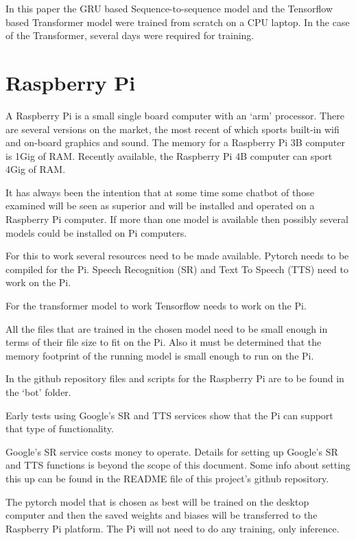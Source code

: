 In this paper the GRU based Sequence-to-sequence model and the Tensorflow based Transformer model were trained from scratch on a CPU laptop. In the case of the Transformer, several days were required for training.

\section{Raspberry Pi}

A Raspberry Pi is a small single board computer with an `arm' processor. There are 
several versions on the market, the most recent of which sports built-in wifi and
on-board graphics and sound. The memory for a Raspberry Pi 3B computer is 1Gig of RAM. Recently
available, the Raspberry Pi 4B computer can sport 4Gig of RAM.

It has always been the intention that at some time some chatbot of
those examined will be seen as superior and will be installed and
operated on a Raspberry Pi computer. If more than one model is available
then possibly several models could be installed on Pi computers.

For this to work several resources need to be made available. Pytorch
needs to be compiled for the Pi. Speech Recognition (\ac{SR}) and Text
To Speech (TTS) need to work on the Pi.

For the transformer model to work Tensorflow needs to work on the Pi.

All the files that are trained in the chosen model need to be small
enough in terms of their file size to fit on the Pi. Also it must
be determined that the memory footprint of the running model is small
enough to run on the Pi.

In the github repository files and scripts for the Raspberry Pi are
to be found in the \textquoteleft bot\textquoteright{} folder.

Early tests using Google\textquoteright s SR and TTS services show
that the Pi can support that type of functionality. 

Google's SR service costs money to operate. Details
for setting up Google's SR and TTS functions is beyond
the scope of this document. Some info about setting this up can be
found in the README file of this project\textquoteright s github
repository.

The pytorch model that is chosen as best will be trained on the
desktop computer and then the saved weights and biases will be transferred
to the Raspberry Pi platform. The Pi will not need to do any training,
only inference. 



